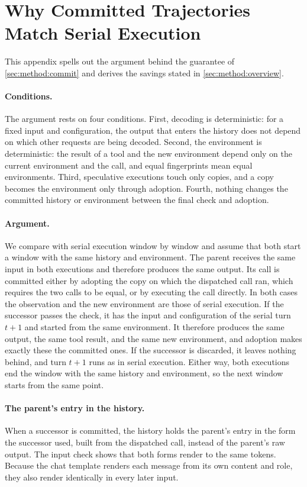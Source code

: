 \section{Why Committed Trajectories Match Serial Execution}
\label{app:consistency}

This appendix spells out the argument behind the guarantee of \cref{sec:method:commit} and derives the savings stated in \cref{sec:method:overview}.

\paragraph{Conditions.}
The argument rests on four conditions.
First, decoding is deterministic: for a fixed input and configuration, the output that enters the history does not depend on which other requests are being decoded.
Second, the environment is deterministic: the result of a tool and the new environment depend only on the current environment and the call, and equal fingerprints mean equal environments.
Third, speculative executions touch only copies, and a copy becomes the environment only through adoption.
Fourth, nothing changes the committed history or environment between the final check and adoption.

\paragraph{Argument.}
We compare \method with serial execution window by window and assume that both start a window with the same history and environment.
The parent receives the same input in both executions and therefore produces the same output.
Its call is committed either by adopting the copy on which the dispatched call ran, which requires the two calls to be equal, or by executing the call directly.
In both cases the observation and the new environment are those of serial execution.
If the successor passes the check, it has the input and configuration of the serial turn $t{+}1$ and started from the same environment.
It therefore produces the same output, the same tool result, and the same new environment, and adoption makes exactly these the committed ones.
If the successor is discarded, it leaves nothing behind, and turn $t{+}1$ runs as in serial execution.
Either way, both executions end the window with the same history and environment, so the next window starts from the same point.

\paragraph{The parent's entry in the history.}
When a successor is committed, the history holds the parent's entry in the form the successor used, built from the dispatched call, instead of the parent's raw output.
The input check shows that both forms render to the same tokens.
Because the chat template renders each message from its own content and role, they also render identically in every later input.

